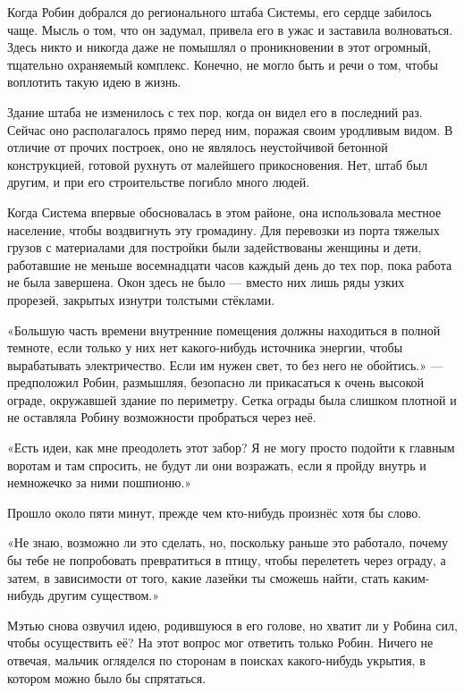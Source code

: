 \documentclass[a5paper, 9pt,
final, openany, twoside=true]{memoir}
\begin{document}
Когда Робин добрался до регионального штаба Системы, его сердце забилось чаще. Мысль о том, что он задумал, привела его в ужас и заставила волноваться. Здесь никто и никогда даже не помышлял о проникновении в этот огромный, тщательно охраняемый комплекс. Конечно, не могло быть и речи о том, чтобы воплотить такую идею в жизнь.

Здание штаба не изменилось с тех пор, когда он видел его в последний раз. Сейчас оно располагалось прямо перед ним, поражая своим уродливым видом. В отличие от прочих построек, оно не являлось неустойчивой бетонной конструкцией, готовой рухнуть от малейшего прикосновения. Нет, штаб был другим, и при его строительстве погибло много людей.

Когда Система впервые обосновалась в этом районе, она использовала местное население, чтобы воздвигнуть эту громадину. Для перевозки из порта тяжелых грузов с материалами для постройки были задействованы женщины и дети, работавшие не меньше восемнадцати часов каждый день до тех пор, пока работа не была завершена. Окон здесь не было — вместо них лишь ряды узких прорезей, закрытых изнутри толстыми стёклами.

«Большую часть времени внутренние помещения должны находиться в полной темноте, если только у них нет какого-нибудь источника энергии, чтобы вырабатывать электричество. Если им нужен свет, то без него не обойтись.» — предположил Робин, размышляя, безопасно ли прикасаться к очень высокой ограде, окружавшей здание по периметру. Сетка ограды была слишком плотной и не оставляла Робину возможности пробраться через неё.

«Есть идеи, как мне преодолеть этот забор? Я не могу просто подойти к главным воротам и там спросить, не будут ли они возражать, если я пройду внутрь и немножечко за ними пошпионю.»\bigskip

Прошло около пяти минут, прежде чем кто-нибудь произнёс хотя бы слово.\bigskip

«Не знаю, возможно ли это сделать, но, поскольку раньше это работало, почему бы тебе не попробовать превратиться в птицу, чтобы перелететь через ограду, а затем, в зависимости от того, какие лазейки ты сможешь найти, стать каким-нибудь другим существом.»

Мэтью снова озвучил идею, родившуюся в его голове, но хватит ли у Робина сил, чтобы осуществить её? На этот вопрос мог ответить только Робин. Ничего не отвечая, мальчик огляделся по сторонам в поисках какого-нибудь укрытия, в котором можно было бы спрятаться.
\end{document}
